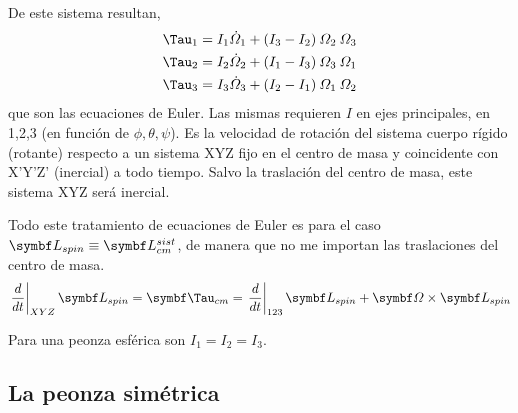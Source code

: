 \documentclass[10pt,oneside]{CBFT_book}
\begin{document}
De este sistema resultan,
\begin{align*}
\Tau_1 = I_1 \dot{\Omega}_1 + (I_3-I_2) \: \Omega_2 \: \Omega_3 \\
\Tau_2 = I_2 \dot{\Omega}_2 + (I_1-I_3) \: \Omega_3 \: \Omega_1 \\
\Tau_3 = I_3 \dot{\Omega}_3 + (I_2-I_1) \: \Omega_1 \: \Omega_2
\end{align*}
que son las ecuaciones de Euler. 
Las mismas requieren $I$ en ejes principales, \vb{\Omega} en 1,2,3 (en función de $\phi,\theta,\psi$).
Es \vb{\Omega} la velocidad de rotación del sistema cuerpo rígido (rotante) respecto a un sistema XYZ
fijo en el centro de masa y coincidente con X'Y'Z' (inercial) a todo tiempo. Salvo la traslación del centro
de masa, este sistema XYZ será inercial.

Todo este tratamiento de ecuaciones de Euler es para el caso $\vb{L}_{spin} \equiv \vb{L}_{cm}^{sist}$, de
manera que no me importan las traslaciones del centro de masa.
\[
	\left.\frac{d}{dt}\right|_{XYZ} \vb{L}_{spin} = \vb{\Tau}_{cm} =
	\left.\frac{d}{dt}\right|_{123} \vb{L}_{spin} + \vb{\Omega} \times \vb{L}_{spin} 
\]

Para una peonza esférica son $I_1=I_2=I_3$.

\subsection{La peonza simétrica}
\end{document}
